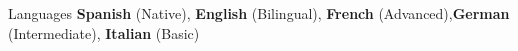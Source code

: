 \begin{rubric}{Languages}
    \textbf{Spanish} (Native), \qquad \textbf{English} (Bilingual), \qquad \textbf{French} (Advanced),\qquad \textbf{German} (Intermediate),
    \qquad \textbf{Italian} (Basic) 
\end{rubric}
